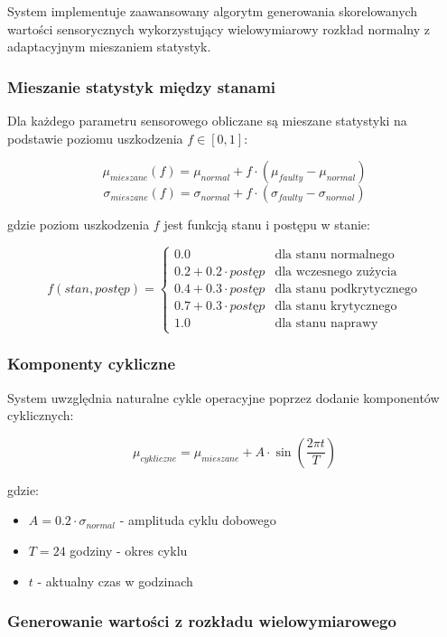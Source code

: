 System implementuje zaawansowany algorytm generowania skorelowanych wartości sensorycznych wykorzystujący wielowymiarowy rozkład normalny z adaptacyjnym mieszaniem statystyk.

\subsubsection{Mieszanie statystyk między stanami}

Dla każdego parametru sensorowego obliczane są mieszane statystyki na podstawie poziomu uszkodzenia $f \in [0, 1]$:

$$\mu_{mieszane}(f) = \mu_{normal} + f \cdot (\mu_{faulty} - \mu_{normal})$$
$$\sigma_{mieszane}(f) = \sigma_{normal} + f \cdot (\sigma_{faulty} - \sigma_{normal})$$

gdzie poziom uszkodzenia $f$ jest funkcją stanu i postępu w stanie:

$$f(stan, postęp) = \begin{cases}
0.0 & \text{dla stanu normalnego} \\
0.2 + 0.2 \cdot postęp & \text{dla wczesnego zużycia} \\
0.4 + 0.3 \cdot postęp & \text{dla stanu podkrytycznego} \\
0.7 + 0.3 \cdot postęp & \text{dla stanu krytycznego} \\
1.0 & \text{dla stanu naprawy}
\end{cases}$$

\subsubsection{Komponenty cykliczne}

System uwzględnia naturalne cykle operacyjne poprzez dodanie komponentów cyklicznych:

$$\mu_{cykliczne} = \mu_{mieszane} + A \cdot \sin\left(\frac{2\pi t}{T}\right)$$

gdzie:
\begin{itemize}
    \item $A = 0.2 \cdot \sigma_{normal}$ - amplituda cyklu dobowego
    \item $T = 24$ godziny - okres cyklu
    \item $t$ - aktualny czas w godzinach
\end{itemize}

\subsubsection{Generowanie wartości z rozkładu wielowymiarowego}

